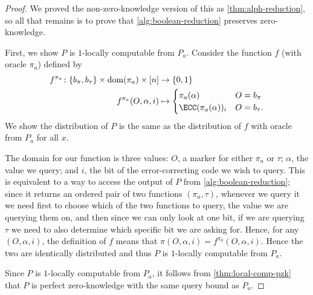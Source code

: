 \documentclass[english,12pt]{reedthesis}
\theoremstyle{plain}
\theoremstyle{definition}
\theoremstyle{remark}
\DeclareMathOperator{\dom}{dom}
\begin{document}
\begin{proof}
  We proved the non-zero-knowledge version of this as \cref{thm:alph-reduction},
  so all that remains is to prove that \cref{alg:boolean-reduction} preserves
  zero-knowledge.

  First, we show $P$ is $1$-locally computable from $P_{a}$. Consider the
  function $f$ (with oracle $\pi_{a}$) defined by
  \begin{equation}\label{eqn:local-alph-red}
    \begin{aligned}
      f^{\pi_{a}}\colon \{b_{\pi}, b_{\tau}\} \times \dom(\pi_{a}) \times [n] &\rightarrow \{0, 1\} \\
      f^{\pi_{a}}(O, \alpha, i) &\mapsto \begin{cases}
        \pi_{a}(\alpha) & O = b_{\pi} \\
        \ECC(\pi_{a}(\alpha))_{i} & O = b_{\tau}.
      \end{cases}
    \end{aligned}
  \end{equation}
  We show the distribution of $P$ is the same as the distribution of $f$ with
  oracle from $P_{a}$ for all $x$.

  The domain for our function is three values: $O$, a marker for either $\pi_{a}$
  or $\tau$; $\alpha$, the value we query; and $i$, the bit of the error-correcting code
  we wish to query. This is equivalent to a way to access the output of $P$ from
  \cref{alg:boolean-reduction}; since it returns an ordered pair of two
  functions $(\pi_{a}, \tau)$, whenever we query it we need first to choose which of
  the two functions to query, the value we are querying them on, and then since
  we can only look at one bit, if we are querying $\tau$ we need to also determine
  which specific bit we are asking for. Hence, for any $(O, \alpha, i)$, the
  definition of $f$ means that $\pi(O, \alpha, i) = f^{\pi_{0}}(O, \alpha, i)$. Hence the two
  are identically distributed and thus $P$ is $1$-locally computable from
  $P_{a}$.

  Since $P$ is $1$-locally computable from $P_{a}$, it follows from
  \cref{thm:local-comp-pzk} that $P$ is perfect zero-knowledge with the same
  query bound as $P_{a}$.
\end{proof}
\end{document}
